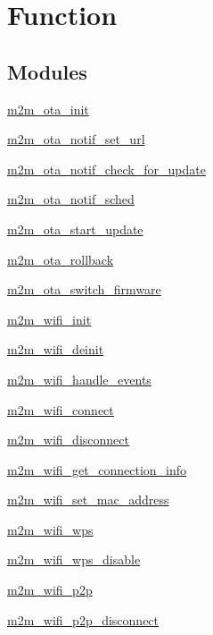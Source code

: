 \hypertarget{group__WLANAPI}{}\section{Function}
\label{group__WLANAPI}
\subsection*{Modules}
\begin{DoxyCompactItemize}
\item 
\hyperlink{group__OtaInitFn}{m2m\+\_\+ota\+\_\+init}
\item 
\hyperlink{group__OtaNotifStFn}{m2m\+\_\+ota\+\_\+notif\+\_\+set\+\_\+url}
\item 
\hyperlink{group__OtaNotifCheckFn}{m2m\+\_\+ota\+\_\+notif\+\_\+check\+\_\+for\+\_\+update}
\item 
\hyperlink{group__OtaSched}{m2m\+\_\+ota\+\_\+notif\+\_\+sched}
\item 
\hyperlink{group__OtaStartUpdatefn}{m2m\+\_\+ota\+\_\+start\+\_\+update}
\item 
\hyperlink{group__OtaRollbackfn}{m2m\+\_\+ota\+\_\+rollback}
\item 
\hyperlink{group__OtaSwitchFirmware}{m2m\+\_\+ota\+\_\+switch\+\_\+firmware}
\item 
\hyperlink{group__WifiInitFn}{m2m\+\_\+wifi\+\_\+init}
\item 
\hyperlink{group__WifiDeinitFn}{m2m\+\_\+wifi\+\_\+deinit}
\item 
\hyperlink{group__WifiHandleEventsFn}{m2m\+\_\+wifi\+\_\+handle\+\_\+events}
\item 
\hyperlink{group__WifiConnectFn}{m2m\+\_\+wifi\+\_\+connect}
\item 
\hyperlink{group__WifiDisconnectFn}{m2m\+\_\+wifi\+\_\+disconnect}
\item 
\hyperlink{group__GetConnectionInfoFn}{m2m\+\_\+wifi\+\_\+get\+\_\+connection\+\_\+info}
\item 
\hyperlink{group__WifiSetMacAddFn}{m2m\+\_\+wifi\+\_\+set\+\_\+mac\+\_\+address}
\item 
\hyperlink{group__WifiWpsFn}{m2m\+\_\+wifi\+\_\+wps}
\item 
\hyperlink{group__WifiWpsDisableFn}{m2m\+\_\+wifi\+\_\+wps\+\_\+disable}
\item 
\hyperlink{group__WifiP2PFn}{m2m\+\_\+wifi\+\_\+p2p}
\item 
\hyperlink{group__WifiP2PDisconnectFn}{m2m\+\_\+wifi\+\_\+p2p\+\_\+disconnect}
\item 

\end{DoxyCompactItemize}
